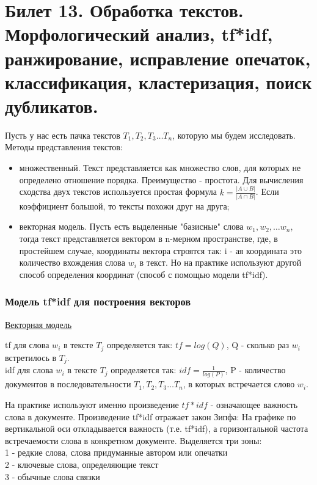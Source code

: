 \newpage
\section {Билет 13. Обработка текстов. Морфологический анализ, tf*idf, ранжирование, исправление опечаток, классификация, кластеризация, поиск дубликатов.}

Пусть у нас есть пачка текстов $T_1, T_2, T_3 \dots T_n$, которую мы будем исследовать. \\
Методы представления текстов:
\begin{itemize}
\item множественный. Текст представляется как множество слов, для которых не определено отношение порядка. Преимущество - простота. Для вычисления сходства двух текстов используется простая формула $k = \frac {|A \cup B|}{|A \cap B|}$. Если коэффициент большой, то тексты похожи друг на друга;
\item векторная модель. Пусть есть выделенные  "базисные" слова $w_1, w_2, \dots w_n$, тогда текст представляется вектором в n-мерном пространстве, где, в простейшем случае, координаты вектора строятся так: i - ая координата это количество вхождения слова $w_i$ в текст. Но на практике используют другой способ определения координат (способ с помощью модели tf*idf).
\end{itemize}

\subsubsection {Модель tf*idf для построения векторов}
\href{https://clck.ru/EqWAS}{Векторная модель} 
\begin{defn}
tf для слова $w_i$ в тексте $T_j$ определяется так: 
 $tf = log (Q)$, Q - сколько раз $w_i$ встретилось в $T_j$.  \\
idf для слова $w_i$ в тексте $T_j$ определяется так: 
$idf = \frac{1}{log(P)}$, P - количество документов в последовательности $T_1, T_2, T_3 \dots T_n$, в которых встречается слово $w_i$. 
\end{defn}
На практике используют именно произведение $tf*idf$ - означающее важность слова в документе. Произведение tf*idf отражает закон Зипфа:
На графике по вертикальной оси откладывается важность (т.е. tf*idf), а горизонтальной частота встречаемости слова в конкретном документе. 
Выделяется три зоны: \\
1 - редкие слова, слова придуманные автором или опечатки \\
2 - ключевые слова, определяющие текст \\
3 - обычные слова связки \\

